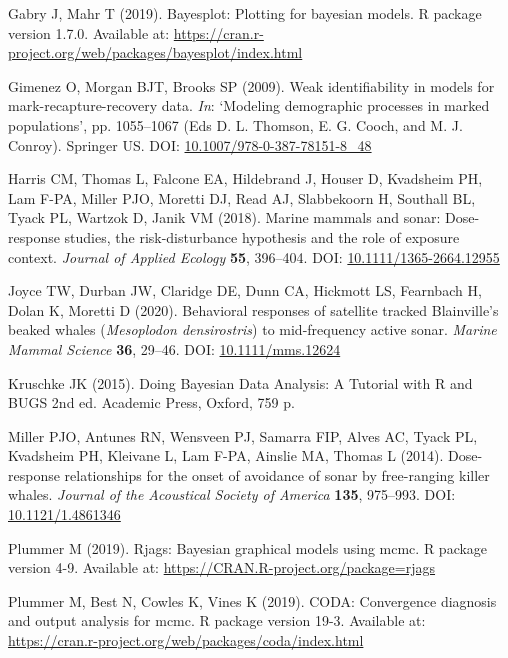\documentclass[
]{article}
\begin{document}
\leavevmode\hypertarget{ref-Gabry2019}{}%
Gabry J, Mahr T (2019). Bayesplot: Plotting for bayesian models. R package version 1.7.0. Available at: \url{https://cran.r-project.org/web/packages/bayesplot/index.html}

\leavevmode\hypertarget{ref-Gimenez2009}{}%
Gimenez O, Morgan BJT, Brooks SP (2009). Weak identifiability in models for mark-recapture-recovery data. \emph{In}: `Modeling demographic processes in marked populations', pp. 1055--1067 (Eds D. L. Thomson, E. G. Cooch, and M. J. Conroy). Springer US. DOI: \href{https://doi.org/10.1007/978-0-387-78151-8_48}{10.1007/978-0-387-78151-8\_48}

\leavevmode\hypertarget{ref-Harris2018}{}%
Harris CM, Thomas L, Falcone EA, Hildebrand J, Houser D, Kvadsheim PH, Lam F-PA, Miller PJO, Moretti DJ, Read AJ, Slabbekoorn H, Southall BL, Tyack PL, Wartzok D, Janik VM (2018). Marine mammals and sonar: Dose-response studies, the risk-disturbance hypothesis and the role of exposure context. \emph{Journal of Applied Ecology} \textbf{55}, 396--404. DOI: \href{https://doi.org/10.1111/1365-2664.12955}{10.1111/1365-2664.12955}

\leavevmode\hypertarget{ref-Joyce2020}{}%
Joyce TW, Durban JW, Claridge DE, Dunn CA, Hickmott LS, Fearnbach H, Dolan K, Moretti D (2020). Behavioral responses of satellite tracked Blainville's beaked whales (\emph{Mesoplodon densirostris}) to mid-frequency active sonar. \emph{Marine Mammal Science} \textbf{36}, 29--46. DOI: \href{https://doi.org/10.1111/mms.12624}{10.1111/mms.12624}

\leavevmode\hypertarget{ref-Kruschke2010}{}%
Kruschke JK (2015). Doing Bayesian Data Analysis: A Tutorial with R and BUGS 2nd ed. Academic Press, Oxford, 759 p.

\leavevmode\hypertarget{ref-Miller2014}{}%
Miller PJO, Antunes RN, Wensveen PJ, Samarra FIP, Alves AC, Tyack PL, Kvadsheim PH, Kleivane L, Lam F-PA, Ainslie MA, Thomas L (2014). Dose-response relationships for the onset of avoidance of sonar by free-ranging killer whales. \emph{Journal of the Acoustical Society of America} \textbf{135}, 975--993. DOI: \href{https://doi.org/10.1121/1.4861346}{10.1121/1.4861346}

\leavevmode\hypertarget{ref-Plummer2019}{}%
Plummer M (2019). Rjags: Bayesian graphical models using mcmc. R package version 4-9. Available at: \url{https://CRAN.R-project.org/package=rjags}

\leavevmode\hypertarget{ref-Plummer2019b}{}%
Plummer M, Best N, Cowles K, Vines K (2019). CODA: Convergence diagnosis and output analysis for mcmc. R package version 19-3. Available at: \url{https://cran.r-project.org/web/packages/coda/index.html}
\end{document}
